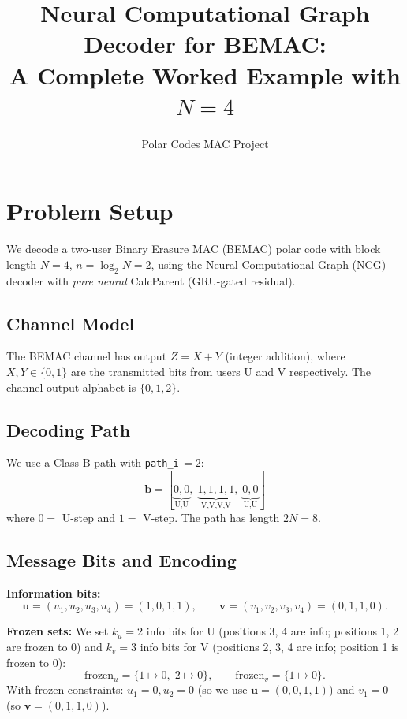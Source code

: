 \documentclass[11pt,a4paper]{article}
\title{Neural Computational Graph Decoder for BEMAC:\\A Complete Worked Example with $N=4$}
\author{Polar Codes MAC Project}
\date{}
\begin{document}
\maketitle
\tableofcontents
\newpage

\section{Problem Setup}
\label{sec:setup}

We decode a two-user Binary Erasure MAC (BEMAC) polar code with block length $N=4$, $n=\log_2 N = 2$, using the Neural Computational Graph (NCG) decoder with \emph{pure neural} CalcParent (GRU-gated residual).

\subsection{Channel Model}

The BEMAC channel has output $Z = X + Y$ (integer addition), where $X,Y \in \{0,1\}$ are the transmitted bits from users U and V respectively. The channel output alphabet is $\{0,1,2\}$.

\subsection{Decoding Path}

We use a Class B path with \texttt{path\_i}$\,= 2$:
\[
\mathbf{b} = [\underbrace{0,0}_{\text{U,U}},\;\underbrace{1,1,1,1}_{\text{V,V,V,V}},\;\underbrace{0,0}_{\text{U,U}}]
\]
where $0 = $ U-step and $1 = $ V-step.  The path has length $2N=8$.

\subsection{Message Bits and Encoding}

\textbf{Information bits:}
\[
\mathbf{u} = (u_1, u_2, u_3, u_4) = (1, 0, 1, 1), \qquad
\mathbf{v} = (v_1, v_2, v_3, v_4) = (0, 1, 1, 0).
\]

\textbf{Frozen sets:} We set $k_u = 2$ info bits for U (positions 3, 4 are info; positions 1, 2 are frozen to 0) and $k_v = 3$ info bits for V (positions 2, 3, 4 are info; position 1 is frozen to 0):
\[
\text{frozen}_u = \{1 \mapsto 0,\; 2 \mapsto 0\}, \qquad
\text{frozen}_v = \{1 \mapsto 0\}.
\]
With frozen constraints: $u_1 = 0, u_2 = 0$ (so we use $\mathbf{u} = (0, 0, 1, 1)$) and $v_1 = 0$ (so $\mathbf{v} = (0, 1, 1, 0)$).
\end{document}
